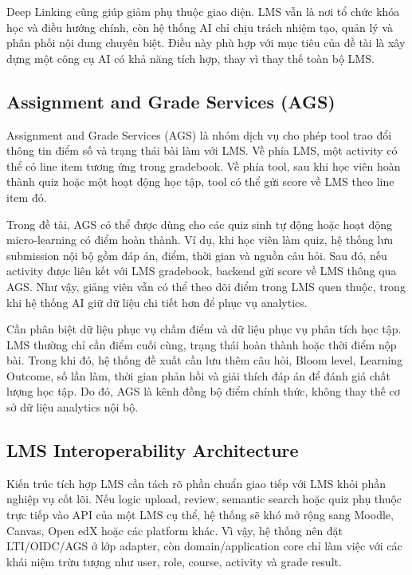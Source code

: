 Deep Linking cũng giúp giảm phụ thuộc giao diện. LMS vẫn là nơi tổ chức khóa học
và điều hướng chính, còn hệ thống AI chỉ chịu trách nhiệm tạo, quản lý và phân
phối nội dung chuyên biệt. Điều này phù hợp với mục tiêu của đề tài là xây dựng
một công cụ AI có khả năng tích hợp, thay vì thay thế toàn bộ LMS.

\subsection{Assignment and Grade Services (AGS)}
\label{subsec:assignment-grade-services}

Assignment and Grade Services (AGS) là nhóm dịch vụ cho phép tool trao đổi thông
tin điểm số và trạng thái bài làm với LMS. Về phía LMS, một activity có thể có
line item tương ứng trong gradebook. Về phía tool, sau khi học viên hoàn thành
quiz hoặc một hoạt động học tập, tool có thể gửi score về LMS theo line item đó.

Trong đề tài, AGS có thể được dùng cho các quiz sinh tự động hoặc hoạt động
micro-learning có điểm hoàn thành. Ví dụ, khi học viên làm quiz, hệ thống lưu
submission nội bộ gồm đáp án, điểm, thời gian và nguồn câu hỏi. Sau đó, nếu
activity được liên kết với LMS gradebook, backend gửi score về LMS thông qua AGS.
Như vậy, giảng viên vẫn có thể theo dõi điểm trong LMS quen thuộc, trong khi hệ
thống AI giữ dữ liệu chi tiết hơn để phục vụ analytics.

Cần phân biệt dữ liệu phục vụ chấm điểm và dữ liệu phục vụ phân tích học tập.
LMS thường chỉ cần điểm cuối cùng, trạng thái hoàn thành hoặc thời điểm nộp bài.
Trong khi đó, hệ thống đề xuất cần lưu thêm câu hỏi, Bloom level, Learning
Outcome, số lần làm, thời gian phản hồi và giải thích đáp án để đánh giá chất
lượng học tập. Do đó, AGS là kênh đồng bộ điểm chính thức, không thay thế cơ sở
dữ liệu analytics nội bộ.

\subsection{LMS Interoperability Architecture}
\label{subsec:lms-interoperability-architecture}

Kiến trúc tích hợp LMS cần tách rõ phần chuẩn giao tiếp với LMS khỏi phần nghiệp
vụ cốt lõi. Nếu logic upload, review, semantic search hoặc quiz phụ thuộc trực
tiếp vào API của một LMS cụ thể, hệ thống sẽ khó mở rộng sang Moodle, Canvas,
Open edX hoặc các platform khác. Vì vậy, hệ thống nên đặt LTI/OIDC/AGS ở lớp
adapter, còn domain/application core chỉ làm việc với các khái niệm trừu tượng
như user, role, course, activity và grade result.


